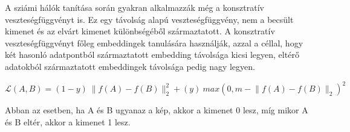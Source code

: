 



A sziámi hálók tanítása során gyakran alkalmazzák még a konsztratív veszteségfüggvényt is. Ez egy távolság alapú veszteségfüggvény, nem a becsült kimenet és az elvárt kimenet különbségéből származtatott. A konsztratív veszteségfüggvényt főleg embeddingek tanulására használják, azzal a céllal, hogy két hasonló adatpontból származtatott embedding távolsága kicsi legyen, eltérő adatokból származtatott embeddingek távolsága pedig nagy legyen. 

\[ \mathcal{L}(A,B) = (1-y)~\lVert f(A) - f(B)\rVert_2^2 + (y)~max\left(0,m - \lVert f(A) - f(B) \rVert_2 \right)^2 \]

Abban az esetben, ha A és B ugyanaz a kép, akkor a kimenet 0 lesz, míg mikor A és B eltér, akkor a kimenet 1 lesz. 